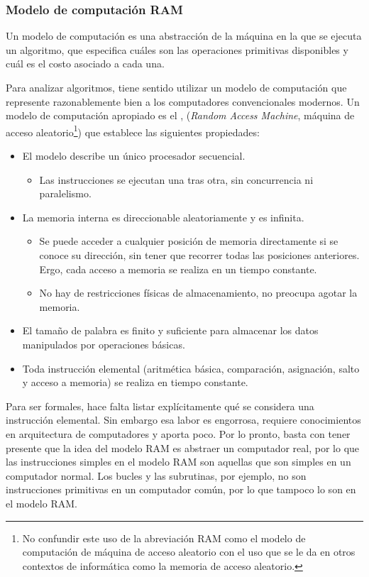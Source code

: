 \subsubsection{Modelo de computación RAM}

Un modelo de computación es una abstracción de la máquina en la que se ejecuta un algoritmo, que especifica cuáles son las operaciones primitivas disponibles y cuál es el costo asociado a cada una.

Para analizar algoritmos, tiene sentido utilizar un modelo de computación que represente razonablemente bien a los computadores convencionales modernos. Un modelo de computación apropiado es el , (\textit{Random Access Machine}, máquina de acceso aleatorio\footnote{No confundir este uso de la abreviación RAM como el modelo de computación de máquina de acceso aleatorio con el uso que se le da en otros contextos de informática como la memoria de acceso aleatorio.}) que establece las siguientes propiedades:
\begin{itemize}
  \item El modelo describe un único procesador secuencial. 
  \begin{itemize}
    \item Las instrucciones se ejecutan una tras otra, sin concurrencia ni paralelismo.
  \end{itemize}
  \item La memoria interna es direccionable aleatoriamente y es infinita.
  \begin{itemize}
    \item Se puede acceder a cualquier posición de memoria directamente si se conoce su dirección, sin tener que recorrer todas las posiciones anteriores. Ergo, cada acceso a memoria se realiza en un tiempo constante.
    \item No hay de restricciones físicas de almacenamiento, no preocupa agotar la memoria.
  \end{itemize}
  \item El tamaño de palabra es finito y suficiente para almacenar los datos manipulados por operaciones básicas.
  \item Toda instrucción elemental (aritmética básica, comparación, asignación, salto y acceso a memoria) se realiza en tiempo constante.
\end{itemize}

Para ser formales, hace falta listar explícitamente qué se considera una instrucción elemental. Sin embargo esa labor es engorrosa, requiere conocimientos en arquitectura de computadores y aporta poco. Por lo pronto, basta con tener presente que la idea del modelo RAM es abstraer un computador real, por lo que las instrucciones simples en el modelo RAM son aquellas que son simples en un computador normal. Los bucles y las subrutinas, por ejemplo, no son instrucciones primitivas en un computador común, por lo que tampoco lo son en el modelo RAM.

